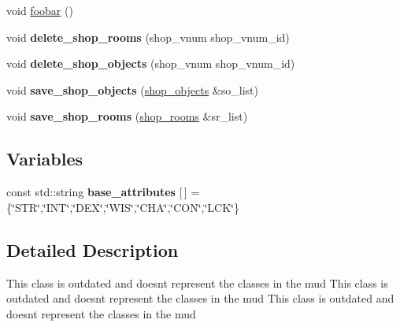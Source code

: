 \begin{DoxyCompactItemize}
\item 
void \hyperlink{namespacemods_1_1orm_accdf745e499a02aa3c7b025477ae3bee}{foobar} ()
\item 
\mbox{\label{namespacemods_1_1orm_a27544adeedafa02e5557ec417e4426b4}} 
void {\bfseries delete\+\_\+shop\+\_\+rooms} (shop\+\_\+vnum shop\+\_\+vnum\+\_\+id)
\item 
\mbox{\label{namespacemods_1_1orm_a4320fbe0ebe2314c6a5083d72f695572}} 
void {\bfseries delete\+\_\+shop\+\_\+objects} (shop\+\_\+vnum shop\+\_\+vnum\+\_\+id)
\item 
\mbox{\label{namespacemods_1_1orm_a292e8507c92a7972d1c6cb54eab93d81}} 
void {\bfseries save\+\_\+shop\+\_\+objects} (\hyperlink{structmods_1_1orm_1_1shop__objects}{shop\+\_\+objects} \&so\+\_\+list)
\item 
\mbox{\label{namespacemods_1_1orm_a4609881e6d165f90af95619548587807}} 
void {\bfseries save\+\_\+shop\+\_\+rooms} (\hyperlink{structmods_1_1orm_1_1shop__rooms}{shop\+\_\+rooms} \&sr\+\_\+list)
\end{DoxyCompactItemize}
\subsection*{Variables}
\begin{DoxyCompactItemize}
\item 
\mbox{\label{namespacemods_1_1orm_aed9abfc6794ebee61041f54db6b91f04}} 
const std\+::string {\bfseries base\+\_\+attributes} \mbox{[}$\,$\mbox{]} = \{\char`\"{}S\+TR\char`\"{},\char`\"{}I\+NT\char`\"{},\char`\"{}D\+EX\char`\"{},\char`\"{}W\+IS\char`\"{},\char`\"{}C\+HA\char`\"{},\char`\"{}C\+ON\char`\"{},\char`\"{}L\+CK\char`\"{}\}
\end{DoxyCompactItemize}


\subsection{Detailed Description}
This class is outdated and doesn\textquotesingle{}t represent the classes in the mud This class is outdated and doesn\textquotesingle{}t represent the classes in the mud This class is outdated and doesn\textquotesingle{}t represent the classes in the mud

